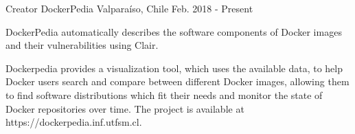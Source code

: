 \begin{cventries}
  \cventry
    {Creator}
    {DockerPedia}
    {Valparaíso, Chile}
    {Feb. 2018 - Present}
    {
      \begin{cvitems}
        \item {DockerPedia automatically describes the software components of Docker images and their vulnerabilities using Clair.}
        \item {Dockerpedia provides a visualization tool, which uses the available data, to help Docker users search and compare between different Docker images, allowing them to find software distributions which fit their needs and monitor the state of Docker repositories over time. The project is available at https://dockerpedia.inf.utfsm.cl.}
      \end{cvitems}
    }

\end{cventries}
